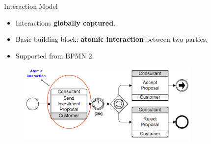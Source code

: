 \documentclass[xcolor=svgnames]{beamer}
\begin{document}

  \begin{frame}{Interaction Model}
    \begin{itemize}
	  \item Interactions \textbf{globally captured}.	
	  \item Basic building block: \textbf{atomic interaction} between two parties.
	  \item Supported from BPMN 2.
	\end{itemize}
    \begin{figure}[!h]
	      \centering
	      \includegraphics[width=0.8\textwidth]{interaction_choreography2.png}
      \end{figure}	
  \end{frame}
\end{document}
